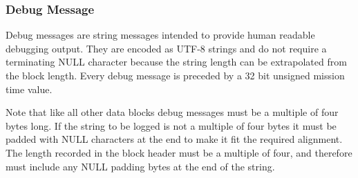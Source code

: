 \subsubsection{Debug Message}

Debug messages are string messages intended to provide human readable debugging output. They are encoded as UTF-8
strings and do not require a terminating NULL character because the string length can be extrapolated from the block
length. Every debug message is preceded by a 32 bit unsigned mission time value.

Note that like all other data blocks debug messages must be a multiple of four bytes long. If the string to be logged
is not a multiple of four bytes it must be padded with NULL characters at the end to make it fit the required
alignment. The length recorded in the block header must be a multiple of four, and therefore must include any NULL
padding bytes at the end of the string.
